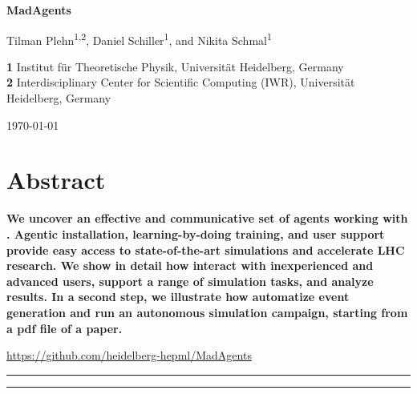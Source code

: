 \documentclass[submission, Phys]{SciPost}
\begin{document}

\begin{center}{\Large \textbf{
MadAgents
}}\end{center}

\begin{center}
Tilman Plehn\textsuperscript{1,2},
Daniel Schiller\textsuperscript{1}, and
Nikita Schmal\textsuperscript{1}
\end{center}

\begin{center}
{\bf 1} Institut f\"ur Theoretische Physik, Universit\"at Heidelberg, Germany\\
{\bf 2} Interdisciplinary Center for Scientific Computing (IWR), Universit\"at Heidelberg, Germany\\
\end{center}

\begin{center}
\today
\end{center}


\section*{Abstract}
{\bf 
    We uncover an effective and communicative set of agents working with \mg. Agentic installation, learning-by-doing training, and user support provide easy access to state-of-the-art simulations and accelerate LHC research. We show in detail how \ma interact with inexperienced and advanced users, support a range of simulation tasks, and analyze results. In a second step, we illustrate how \ma automatize event generation and run an autonomous simulation campaign, starting from a pdf file of a paper.
}

{
\vspace{5pt}
\noindent \url{https://github.com/heidelberg-hepml/MadAgents}
}


\vspace{10pt}
\noindent\rule{\textwidth}{1pt}
\tableofcontents\thispagestyle{fancy}
\noindent\rule{\textwidth}{1pt}
\vspace{10pt}
\end{document}
